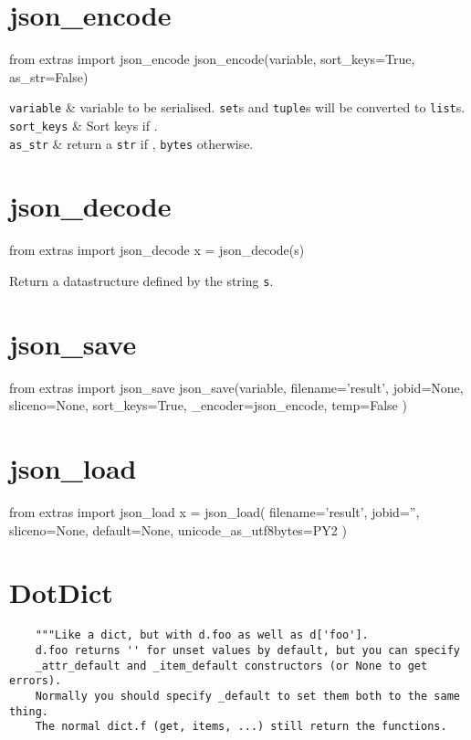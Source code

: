 \section{json\_encode}
\begin{python}
from extras import json_encode
json_encode(variable, sort_keys=True, as_str=False)
\end{python}

\starttabletwo
\RPtwo \texttt{variable} & variable to be serialised.  \texttt{set}s and
\texttt{tuple}s will be converted to \texttt{list}s.\\[1ex]

\RPtwo \texttt{sort\_keys} & Sort keys if \pyTrue.\\[1ex]

\RPtwo \texttt{as\_str} & return a \texttt{str} if \pyTrue, \texttt{bytes}
otherwise.
\stoptabletwo



\section{json\_decode}
\begin{python}
from extras import json_decode
x = json_decode(s)
\end{python}
Return a datastructure defined by the string \texttt{s}.




\section{json\_save}
\begin{python}
from extras import json_save
json_save(variable,
    filename='result',
    jobid=None,
    sliceno=None,
    sort_keys=True,
    _encoder=json_encode,
    temp=False
)
\end{python}




\section{json\_load}
\begin{python}
from extras import json_load
x = json_load(
    filename='result',
    jobid='',
    sliceno=None,
    default=None,
    unicode_as_utf8bytes=PY2
)
\end{python}






\section{DotDict}
\begin{verbatim}
    """Like a dict, but with d.foo as well as d['foo'].
    d.foo returns '' for unset values by default, but you can specify
    _attr_default and _item_default constructors (or None to get errors).
    Normally you should specify _default to set them both to the same thing.
    The normal dict.f (get, items, ...) still return the functions.
\end{verbatim}




